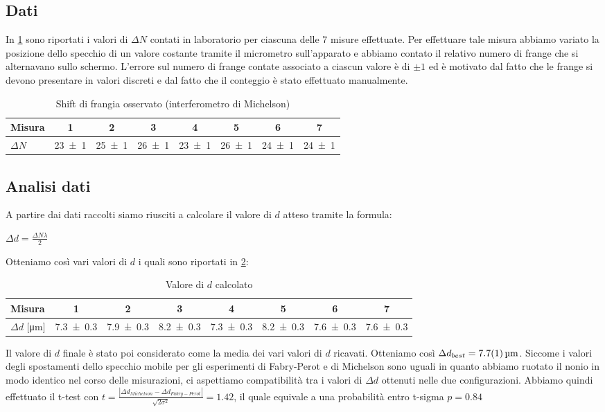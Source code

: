 \documentclass[a4paper]{article}
\begin{document}
\subsection{Dati}
In \cref{tab:micrometro-michelson} sono riportati i valori di $\Delta N$ contati in laboratorio per ciascuna delle 7 misure effettuate. Per effettuare tale misura abbiamo variato la posizione dello specchio di un valore costante tramite il micrometro sull'apparato e abbiamo contato il relativo numero di frange che si alternavano sullo schermo. L'errore sul numero di frange contate associato a ciascun valore è di $\pm1$ ed è motivato dal fatto che le frange si devono presentare in valori discreti e dal fatto che il conteggio è stato effettuato manualmente. 
\begin{table}[htbp]
\centering
\caption{Shift di frangia osservato (interferometro di Michelson)}
\begin{tabular}{|l|ccccccc|}
\hline
Misura & 1 & 2 & 3 & 4 & 5 & 6 & 7 \\\hline\hline
$\Delta N$ & \num{23 \pm 1} & \num{25 \pm 1} & \num{26 \pm 1} & \num{23 \pm 1} & \num{26 \pm 1} & \num{24 \pm 1} & \num{24 \pm 1} \\\hline
\end{tabular}
\label{tab:micrometro-michelson}
\end{table}
\subsection{Analisi dati}
A partire dai dati raccolti siamo riusciti a calcolare il valore di $d$ atteso tramite la formula: 
\begin{center}
    $\Delta d=\frac{\Delta N \lambda}{2}$
\end{center}
Otteniamo così vari valori di $d$ i quali sono riportati in \cref{tab:valori-d-michelson}:
\begin{table}[htbp]
\centering
\caption{Valore di $d$ calcolato}
\begin{tabular}{|l|ccccccc|}
\hline
Misura & 1 & 2 & 3 & 4 & 5 & 6 & 7 \\\hline\hline
$\Delta d$ [\si{\micro\meter}] & \num{7.3 \pm 0.3} & \num{7.9 \pm 0.3} & \num{8.2 \pm 0.3} & \num{7.3 \pm 0.3} & \num{8.2 \pm 0.3} & \num{7.6 \pm 0.3} & \num{7.6 \pm 0.3} \\\hline
\end{tabular}
\label{tab:valori-d-michelson}
\end{table} 
Il valore di $d$ finale è stato poi considerato come la media dei vari valori di $d$ ricavati. Otteniamo così $\Delta d_{best}=\SI{7.7 \pm 0.1}{\micro\meter}$.
Siccome i valori degli spostamenti dello specchio mobile per gli esperimenti di Fabry-Perot e di Michelson sono uguali in quanto abbiamo ruotato il nonio in modo identico nel corso delle misurazioni, ci aspettiamo compatibilità tra i valori di $\Delta d$ ottenuti nelle due configurazioni. Abbiamo quindi effettuato il t-test con $t=\frac{|\Delta d_{Michelson}-\Delta d_{Fabry-Perot}|}{\sqrt{2\sigma^2}}=\num{1.42}$, il quale equivale a una probabilità entro t-sigma $p=\num{0.84}$
\end{document}
